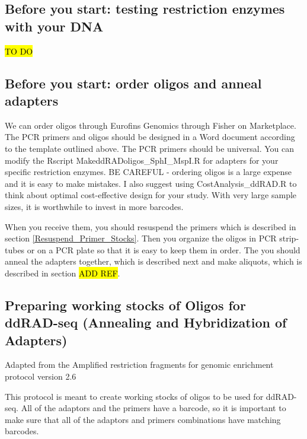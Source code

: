 \documentclass[11pt, oneside]{article}
\begin{document}
	
	\clearpage
	\newpage

		\vspace{5mm}

	\subsection {Before you start: testing restriction enzymes with your DNA}
	\hl{TO DO}
	
	\subsection {Before you start: order oligos and anneal adapters}	
		We can order oligos through Eurofins Genomics through Fisher on Marketplace.  The PCR primers and oligos should be designed in a Word document according to the template outlined above.  The PCR primers should be universal.  You can modify the Rscript MakeddRADoligos\_SphI\_MspI.R for adapters for your specific restriction enzymes.  BE CAREFUL - ordering oligos is a large expense and it is easy to make mistakes.  I also suggest using CostAnalysis\_ddRAD.R to think about optimal cost-effective design for your study.  With very large sample sizes, it is worthwhile to invest in more barcodes.  
		
		When you receive them, you should resuspend the primers which is described in section \ref{Resuspend_Primer_Stocks}.  Then you organize the oligos in PCR strip-tubes or on a PCR plate so that it is easy to keep them in order.  The you should anneal the adapters together, which is described next and make aliquots, which is described in section \hl{ADD REF}.
		
		\subsection{Preparing working stocks of Oligos for ddRAD-seq (Annealing and Hybridization of Adapters) \label{oligo_ddRAD}}	
	
		\begin{adjustwidth}{0.25in}{0pt} Adapted from the Amplified restriction fragments for genomic enrichment protocol version 2.6 \end{adjustwidth}
			
		\noindent This protocol is meant to create working stocks of oligos to be used for ddRAD-seq. All of the adaptors and the primers have a barcode, so it is important to make sure that all of the adaptors and primers combinations have matching barcodes. 
	
\end{document}
